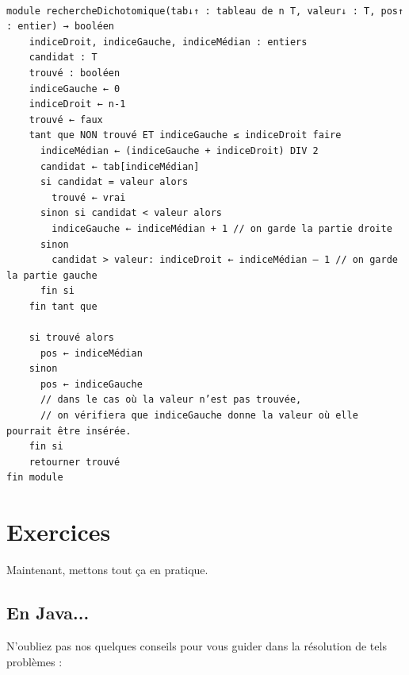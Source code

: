 \documentclass[11pt,a4paper]{article}
\begin{document}
            \par
        \begin{verbatim}

module rechercheDichotomique(tab↓↑ : tableau de n T, valeur↓ : T, pos↑ : entier) → booléen
    indiceDroit, indiceGauche, indiceMédian : entiers
    candidat : T
    trouvé : booléen
    indiceGauche ← 0
    indiceDroit ← n-1
    trouvé ← faux
    tant que NON trouvé ET indiceGauche ≤ indiceDroit faire
      indiceMédian ← (indiceGauche + indiceDroit) DIV 2
      candidat ← tab[indiceMédian]
      si candidat = valeur alors 
        trouvé ← vrai
      sinon si candidat < valeur alors
        indiceGauche ← indiceMédian + 1 // on garde la partie droite
      sinon 
        candidat > valeur: indiceDroit ← indiceMédian – 1 // on garde la partie gauche
      fin si
    fin tant que
    
    si trouvé alors
      pos ← indiceMédian
    sinon
      pos ← indiceGauche
      // dans le cas où la valeur n’est pas trouvée,
      // on vérifiera que indiceGauche donne la valeur où elle pourrait être insérée.
    fin si
    retourner trouvé
fin module
\end{verbatim}\section{Exercices}
				Maintenant, mettons tout \c ca en pratique.
      
            \par
        \subsection{En Java...}
        N'oubliez pas nos quelques conseils pour vous guider dans la r\'esolution de tels probl\`emes :
        
\end{document}
